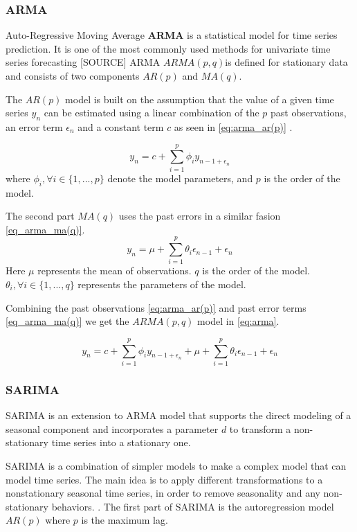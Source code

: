 
\subsubsection{ARMA}
Auto-Regressive Moving Average \textbf{ARMA} is a statistical model for time series prediction. It is one of the most commonly used methods for univariate time series forecasting [SOURCE]
ARMA $ARMA(p, q)$is defined for stationary data and consists of two components $AR(p)$ and $MA(q)$.

The $AR(p)$ model is built on the assumption that the value of a given time series $y_n$ can be estimated using a linear combination
of the $p$ past observations, an error term $\epsilon_n$ and a constant term $c$ as seen in \autoref{eq:arma_ar(p)} \cite{Box2016}.

\begin{equation}
    \label{eq:arma_ar(p)}
    y_n = c + \sum_{i=1}^{p} \phi_i y_{n-1 + \epsilon_n}
\end{equation}
  where $\phi_i, \forall i \in \{1, ..., p\} $ denote the model parameters, and $p$ is the order of the model.

The second part $MA(q)$ uses the past errors in a similar fasion \autoref{eq_arma_ma(q)}.
\begin{equation}
    \label{eq_arma_ma(q)}
    y_n = \mu + \sum_{i=1}^{p} \theta_i \epsilon_{n-1} + \epsilon_n
\end{equation}
Here $\mu$ represents the mean of observations. $q$ is the order of the model. $\theta_i, \forall i \in \{1, ..., q\}$ represents the parameters of the model.

Combining the past observations \autoref{eq:arma_ar(p)} and past error terms \autoref{eq_arma_ma(q)} we get the $ARMA(p,q)$ model in \autoref{eq:arma}.

\begin{equation}
    \label{eq:arma}
    y_n = c + \sum_{i=1}^{p} \phi_i y_{n-1 + \epsilon_n} + \mu + \sum_{i=1}^{p} \theta_i \epsilon_{n-1} + \epsilon_n
\end{equation}

\subsubsection{SARIMA}
SARIMA is an extension to ARMA model that supports the direct modeling of a seasonal component and incorporates a parameter $d$
to transform a non-stationary time series into a stationary one.

SARIMA is a combination of simpler models to make a complex model that can model time series.
The main idea is to apply different transformations to a nonstationary seasonal time series,
in order to remove seasonality and any non-stationary behaviors.
\citet[p. 327-385]{Utlaut2008}.
The first part of SARIMA is the autoregression model
$AR(p)$ where $p$ is the maximum lag.

